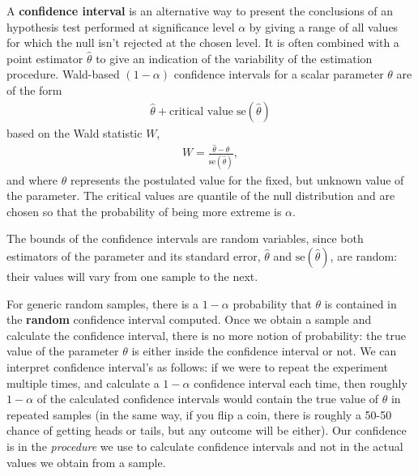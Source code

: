 \documentclass[
  11pt,
  letterpaper,
]{scrbook}
\theoremstyle{definition}
\theoremstyle{definition}
\theoremstyle{remark}
\begin{document}
A \textbf{confidence interval} is an alternative way to present the
conclusions of an hypothesis test performed at significance level
\(\alpha\) by giving a range of all values for which the null isn't
rejected at the chosen level. It is often combined with a point
estimator \(\hat{\theta}\) to give an indication of the variability of
the estimation procedure. Wald-based \((1-\alpha)\) confidence intervals
for a scalar parameter \(\theta\) are of the form \begin{align*}
\widehat{\theta} + \text{critical value} \; \mathrm{se}(\widehat{\theta})
\end{align*} based on the Wald statistic \(W\), \begin{align*}
W =\frac{\widehat{\theta}-\theta}{\mathrm{se}(\widehat{\theta})},
\end{align*} and where \(\theta\) represents the postulated value for
the fixed, but unknown value of the parameter. The critical values are
quantile of the null distribution and are chosen so that the probability
of being more extreme is \(\alpha\).

The bounds of the confidence intervals are random variables, since both
estimators of the parameter and its standard error, \(\widehat{\theta}\)
and \(\mathrm{se}(\widehat{\theta})\), are random: their values will
vary from one sample to the next.

For generic random samples, there is a \(1-\alpha\) probability that
\(\theta\) is contained in the \textbf{random} confidence interval
computed. Once we obtain a sample and calculate the confidence interval,
there is no more notion of probability: the true value of the parameter
\(\theta\) is either inside the confidence interval or not. We can
interpret confidence interval's as follows: if we were to repeat the
experiment multiple times, and calculate a \(1-\alpha\) confidence
interval each time, then roughly \(1-\alpha\) of the calculated
confidence intervals would contain the true value of \(\theta\) in
repeated samples (in the same way, if you flip a coin, there is roughly
a 50-50 chance of getting heads or tails, but any outcome will be
either). Our confidence is in the \emph{procedure} we use to calculate
confidence intervals and not in the actual values we obtain from a
sample.
\end{document}
